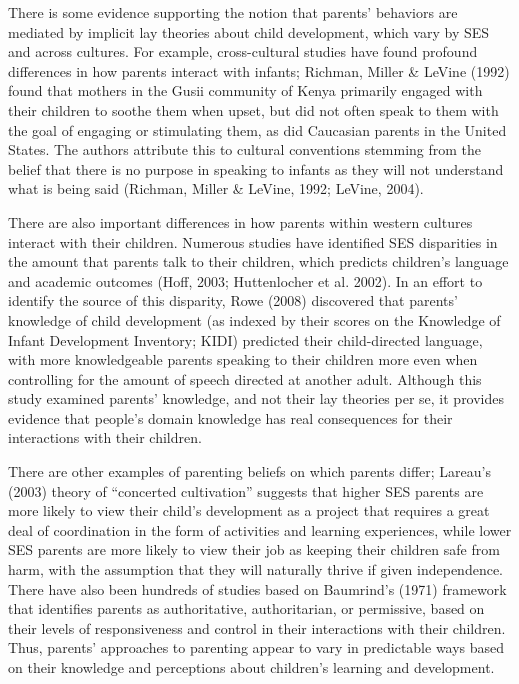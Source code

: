 \documentclass[10pt, letterpaper]{article}
\begin{document}
There is some evidence supporting the notion that parents' behaviors are
mediated by implicit lay theories about child development, which vary by
SES and across cultures. For example, cross-cultural studies have found
profound differences in how parents interact with infants; Richman,
Miller \& LeVine (1992) found that mothers in the Gusii community of
Kenya primarily engaged with their children to soothe them when upset,
but did not often speak to them with the goal of engaging or stimulating
them, as did Caucasian parents in the United States. The authors
attribute this to cultural conventions stemming from the belief that
there is no purpose in speaking to infants as they will not understand
what is being said (Richman, Miller \& LeVine, 1992; LeVine, 2004).

There are also important differences in how parents within western
cultures interact with their children. Numerous studies have identified
SES disparities in the amount that parents talk to their children, which
predicts children's language and academic outcomes (Hoff, 2003;
Huttenlocher et al. 2002). In an effort to identify the source of this
disparity, Rowe (2008) discovered that parents' knowledge of child
development (as indexed by their scores on the Knowledge of Infant
Development Inventory; KIDI) predicted their child-directed language,
with more knowledgeable parents speaking to their children more even
when controlling for the amount of speech directed at another adult.
Although this study examined parents' knowledge, and not their lay
theories per se, it provides evidence that people's domain knowledge has
real consequences for their interactions with their children.

There are other examples of parenting beliefs on which parents differ;
Lareau's (2003) theory of ``concerted cultivation'' suggests that higher
SES parents are more likely to view their child's development as a
project that requires a great deal of coordination in the form of
activities and learning experiences, while lower SES parents are more
likely to view their job as keeping their children safe from harm, with
the assumption that they will naturally thrive if given independence.
There have also been hundreds of studies based on Baumrind's (1971)
framework that identifies parents as authoritative, authoritarian, or
permissive, based on their levels of responsiveness and control in their
interactions with their children. Thus, parents' approaches to parenting
appear to vary in predictable ways based on their knowledge and
perceptions about children's learning and development.
\end{document}
